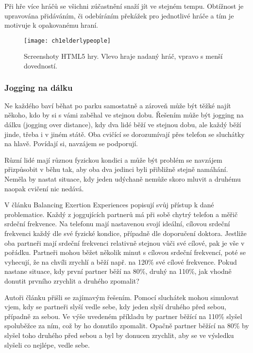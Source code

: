 Při hře více hráčů se všichni zúčastnění snaží jít ve stejném tempu. Obtížnost je upravována přidáváním, či odebíráním překážek pro jednotlivé hráče a tím je motivuje k opakovanému hraní.

\begin{figure}
  \centering
  \texttt{[image: ch1elderlypeople]}
	\caption{Screenshoty HTML5 hry. Vlevo hraje nadaný hráč, vpravo s menší dovedností. \cite{8} }
	\label{ch1elderlypeople}
\end{figure}

\subsubsection{Jogging na dálku}

Ne každého baví běhat po parku samostatně a zároveň může být těžké najít někoho, kdo by si s vámi zaběhal ve stejnou dobu. Řešením může být jogging na dálku (jogging over distance), kdy dva lidé běží ve stejnou dobu, ale každý běží jinde, třeba i v jiném státě. Oba cvičící se dorozumívají přes telefon se sluchátky na hlavě. Povídají si, navzájem se podporují.

Různí lidé mají různou fyzickou kondici a může být problém se navzájem přizpůsobit v běhu tak, aby oba dva jedinci byli přibližně stejně namáhání. Neměla by nastat situace, kdy jeden udýchaně nemůže skoro mluvit a druhému naopak cvičení nic nedává.

V článku Balancing Exertion Experiences \cite{7} popisují svůj přístup k dané problematice. Každý z joggujících partnerů má při sobě chytrý telefon a měřič srdeční frekvence. Na telefonu mají nastavenou svojí ideální, cílovou srdeční frekvenci každý dle své fyzické kondice, případně dle doporučení doktora. Jestliže oba partneři mají srdeční frekvenci relativně stejnou vůči své cílové, pak je vše v pořádku. Partneři mohou běžet několik minut s cílovou srdeční frekvencí, poté se vyhecují, že na chvíli zrychlí a běží např. na 120\% své cílové frekvence. Pokud nastane situace, kdy první partner běží na 80\%, druhý na 110\%, jak vhodně donutit prvního zrychlit a druhého zpomalit? 

Autoři článku přišli se zajímavým řešením. Pomocí sluchátek mohou simulovat vjem, kdy se partneři slyší vedle sebe, kdy jeden slyší druhého před sebou, případně za sebou. Ve výše uvedeném příkladu by partner běžící na 110\% slyšel spoluběžce za ním, což by ho donutilo zpomalit. Opačně partner běžící na 80\% by slyšel toho druhého před sebou a byl by donucen zrychlit, aby se ve výsledku slyšeli co nejlépe, vedle sebe.

